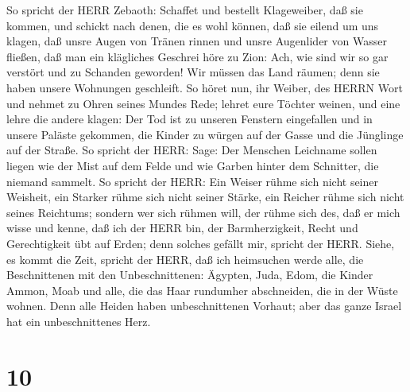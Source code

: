  So spricht der HERR Zebaoth: Schaffet und bestellt
Klageweiber, daß sie kommen, und schickt nach denen, die es wohl können,
 daß sie eilend um uns klagen, daß unsre Augen von Tränen
rinnen und unsre Augenlider von Wasser fließen,  daß man
ein klägliches Geschrei höre zu Zion: Ach, wie sind wir so gar verstört
und zu Schanden geworden! Wir müssen das Land räumen; denn sie haben
unsere Wohnungen geschleift.  So höret nun, ihr Weiber, des
HERRN Wort und nehmet zu Ohren seines Mundes Rede; lehret eure Töchter
weinen, und eine lehre die andere klagen:  Der Tod ist zu
unseren Fenstern eingefallen und in unsere Paläste gekommen, die Kinder
zu würgen auf der Gasse und die Jünglinge auf der Straße. 
So spricht der HERR: Sage: Der Menschen Leichname sollen liegen wie der
Mist auf dem Felde und wie Garben hinter dem Schnitter, die niemand
sammelt.  So spricht der HERR: Ein Weiser rühme sich nicht
seiner Weisheit, ein Starker rühme sich nicht seiner Stärke, ein Reicher
rühme sich nicht seines Reichtums;  sondern wer sich rühmen
will, der rühme sich des, daß er mich wisse und kenne, daß ich der HERR
bin, der Barmherzigkeit, Recht und Gerechtigkeit übt auf Erden; denn
solches gefällt mir, spricht der HERR.  Siehe, es kommt die
Zeit, spricht der HERR, daß ich heimsuchen werde alle, die Beschnittenen
mit den Unbeschnittenen:  Ägypten, Juda, Edom, die Kinder
Ammon, Moab und alle, die das Haar rundumher abschneiden, die in der
Wüste wohnen. Denn alle Heiden haben unbeschnittenen Vorhaut; aber das
ganze Israel hat ein unbeschnittenes Herz.

\hypertarget{section-9}{%
\section{10}\label{section-9}}

